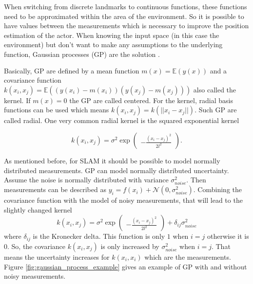 When switching from discrete landmarks to continuous functions, these functions need to be approximated within the area of the environment. So it is possible to have values between the measurements which is necessary to improve the position estimation of the actor. When knowing the input space (in this case the environment) but don't want to make any assumptions to the underlying function, Gaussian processes (GP) are the solution \cite{ebden_gaussian_2015}.

Basically, GP are defined by a mean function $m(x) = \mathbb{E}(y(x))$ and a covariance function $k(x_i, x_j) = \mathbb{E}((y(x_i) - m(x_i)) (y(x_j) - m(x_j)))$ also called the kernel. If $m(x) = 0$ the GP are called centered. For the kernel, radial basis functions can be used which means $k(x_i, x_j) = k(||x_i - x_j||)$. Such GP are called radial. One very common radial kernel is the squared exponential kernel \cite{ebden_gaussian_2015}

$$
k(x_i, x_j) = \sigma ^2 \exp 
\begin{pmatrix}
-\frac{(x_i - x_j)^2}{2l^2}
\end{pmatrix}\text{.}
$$

As mentioned before, for SLAM it should be possible to model normally distributed measurements. GP can model normally distributed uncertainty. Assume the noise is normally distributed with variance $\sigma^2_{noise}$. Then measurements can be described as $y_i = f(x_i) + \mathcal{N}(0, \sigma^2_{noise})$. Combining the covariance function with the model of noisy measurements, that will lead to the slightly changed kernel
$$
k(x_i, x_j) = \sigma ^2 \exp 
\begin{pmatrix}
-\frac{(x_i - x_j)^2}{2l^2}
\end{pmatrix}
+ \delta_{ij} \sigma^2_{noise}
$$
where $\delta_{ij}$ is the Kronecker delta. This function is only $1$ when $i=j$ otherwise it is $0$. So, the covariance $k(x_i, x_j)$ is only increased by $\sigma^2_{noise}$ when $i=j$. That means the uncertainty increases for $k(x_i, x_i)$ which are the measurements. Figure \ref{fig:gaussian_process_example} gives an example of GP with and without noisy measurements.

